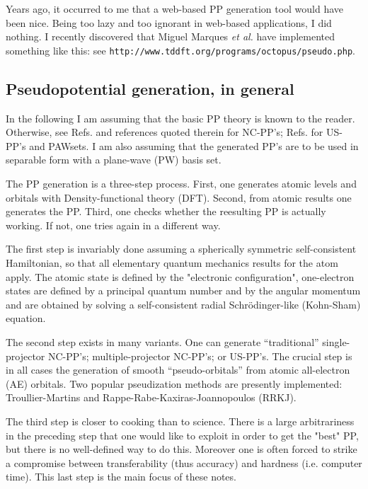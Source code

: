 \documentclass[12pt,a4paper]{article}
\begin{document}
Years ago, it occurred to me that a web-based PP generation
tool would have been nice. Being too lazy and too ignorant 
in web-based applications, I did nothing.
I recently discovered that Miguel Marques {\em et al.} have
implemented something like this: see
{\tt http://www.tddft.org/programs/octopus/pseudo.php}.

\subsection{Pseudopotential generation, in general} 

In the following I am assuming that the basic PP theory 
is known to the reader. Otherwise, see 
Refs.\cite{NC,BHS,TM,fhi98PP,RRKJ} and references quoted 
therein for NC-PP's; Refs.\cite{van,PAW} for US-PP's and PAWsets. 
I am also assuming that the generated PP's are to be used
in separable form \cite{KB} with a plane-wave (PW) basis set.

The PP generation is a three-step process. First, one generates
atomic levels and orbitals with Density-functional theory (DFT). 
Second, from atomic results one generates the PP. Third, one checks 
whether the reesulting PP is actually working. If not, one tries again in 
a different way.

The first step is invariably done assuming a spherically symmetric
self-consistent Hamiltonian, so that all elementary quantum mechanics 
results for the atom apply. The atomic state is defined by the
"electronic configuration", one-electron states are defined by a
principal quantum number and by the angular momentum and are obtained
by solving a self-consistent radial Schr\"odinger-like (Kohn-Sham)
equation.

The second step exists in many variants. One can generate ``traditional'' 
single-projector NC-PP's; multiple-projector NC-PP's; or US-PP's.
The crucial step is in all cases the generation of smooth
``pseudo-orbitals''  from atomic all-electron (AE) orbitals. 
Two popular pseudization
methods are presently implemented: Troullier-Martins \cite{TM}
and Rappe-Rabe-Kaxiras-Joannopoulos \cite{RRKJ} (RRKJ).

The third step is closer to cooking than to science. There is a
large arbitrariness in the preceding step that one would like to 
exploit in order to get the "best" PP, but there is no well-defined
way to do this. Moreover one is often forced to strike a compromise
between transferability (thus accuracy) and hardness (i.e. computer 
time). This last step is the main focus of these notes.
\end{document}
